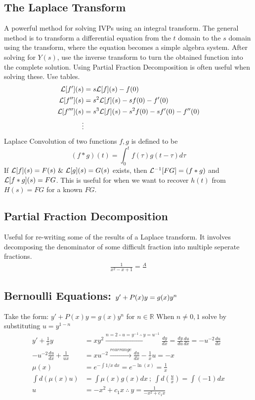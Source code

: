 \documentclass{article}
\begin{document}
\subsection{The Laplace Transform}
    A powerful method for solving IVPs using an integral transform. The general method is to transform a differential equation from the $t$ domain to the $s$ domain using the transform, where the equation becomes a simple algebra system. After solving for $Y(s)$, use the inverse transform to turn the obtained function into the complete solution.  Using Partial Fraction Decomposition is often useful when solving these. Use tables.
    \begin{align*}
        \mathcal{L}[f'](s)&=s\mathcal{L}[f](s)-f(0)
        \\
        \mathcal{L}[f''](s)&=s^2\mathcal{L}[f](s)-sf(0)-f'(0)
        \\
        \mathcal{L}[f'''](s)&=s^3\mathcal{L}[f](s)-s^2f(0)-sf'(0)-f''(0)
        \\
        \vdots
    \end{align*}
    Laplace Convolution of two functions $f,g$ is defined to be 
    \[
    (f*g)(t)=\int_0^tf(\tau)g(t-\tau)d\tau
    \]
    If $\mathcal{L}[f](s)=F(s)~\&~\mathcal{L}[g](s)=G(s)$ exists, then $\mathcal{L}^{-1}[FG]=(f*g)$ and $\mathcal{L}[f*g](s)=FG$. This is useful for when we want to recover $h(t)$ from $H(s)=FG$ for a known $FG$.
\subsection{Partial Fraction Decomposition}
Useful for re-writing some of the results of a Laplace transform. It involves decomposing the denominator of some difficult fraction into multiple seperate fractions. 
\begin{align*}
    \frac{1}{x^2-x+1}=\frac{A}{}
\end{align*}
\newpage
\subsection{Bernoulli Equations: \protect\(y'+P(x)y=g(x)y^n\protect\protect\)}
    Take the form: $y'+P(x)y=g(x)y^n$ for $n \in \mathbb{R}$ When $n \neq 0,1$ solve by substituting $u=y^{1-n}$
    \begin{align*}
        y'+\frac{1}{x}y&=xy^2\xrightarrow{n=2\ \therefore\ u=y^{-1}\ \therefore\ y=u^{-1}} \frac{dy}{dx}=\frac{dy}{du}\frac{du}{dx}=-u^{-2}\frac{du}{dx}\\
        -u^{-2}\frac{du}{dx}+\frac{1}{ux}&=xu^{-2}\xrightarrow{rearrange}\frac{du}{dx}-\frac{1}{x}u=-x\\
        \mu(x)&=e^{-\int 1/x\ dx}=e^{-\ln(x)}=\frac{1}{x}\\
        \int d(\mu(x)u)&=\int \mu(x)g(x)dx\ ;\ \int d\left(\frac{u}{x}\right)=\int (-1)dx\\
        u&=-x^2+c_1x\ \therefore\ \boxed{y=\frac{1}{-x^2+c_1x}}
        \end{align*}
\end{document}
